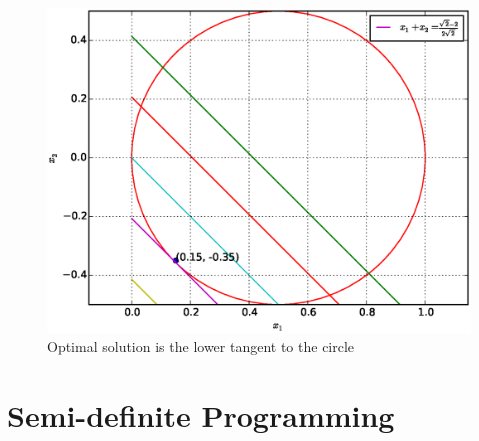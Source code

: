 \documentclass[journal,12pt,twocolumn]{IEEEtran}
\begin{document}
%
%
\begin{figure}[!ht]
\centering
\includegraphics[width=\columnwidth]{./figs/2.15.eps}
\caption{ Optimal solution is the lower tangent to the circle}
\label{fig.2.15}	
\end{figure}
%

\section{Semi-definite Programming}

\end{document}
